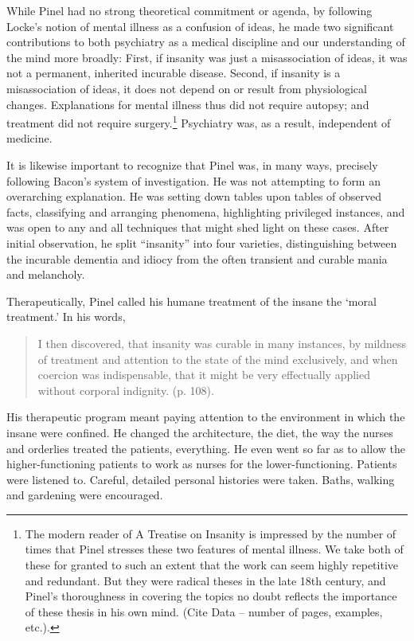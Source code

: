 \begin{refsection}
While Pinel had no strong theoretical commitment or agenda, by following Locke's notion of mental illness as a confusion of ideas, he made two significant contributions to both psychiatry as a medical discipline and our understanding of the mind more broadly: First, if insanity was just a misassociation of ideas, it was not a permanent, inherited incurable disease. Second, if insanity is a misassociation of ideas, it does not depend on or result from physiological changes. Explanations for mental illness thus did not require autopsy; and treatment did not require surgery.\footnote{The modern reader of A Treatise on Insanity is impressed by the number of times that Pinel stresses these two features of mental illness. We take both of these for granted to such an extent that the work can seem highly repetitive and redundant. But they were radical theses in the late 18th century, and Pinel's thoroughness in covering the topics no doubt reflects the importance of these thesis in his own mind. (Cite Data – number of pages, examples, etc.).} Psychiatry was, as a result, independent of medicine.

It is likewise important to recognize that Pinel was, in many ways, precisely following Bacon's system of investigation. He was not attempting to form an overarching explanation. He was setting down tables upon tables of observed facts, classifying and arranging phenomena, highlighting privileged instances, and was open to any and all techniques that might shed light on these cases. After initial observation, he split ``insanity'' into four varieties, distinguishing between the incurable dementia and idiocy from the often transient and curable mania and melancholy.

Therapeutically, Pinel called his humane treatment of the insane the `moral treatment.' In his words,

\begin{quote}

I then discovered, that insanity was curable in many instances, by mildness of treatment and attention to the state of the mind exclusively, and when coercion was indispensable, that it might be very effectually applied without corporal indignity. (p. 108).
\end{quote}

His therapeutic program meant paying attention to the environment in which the insane were confined. He changed the architecture, the diet, the way the nurses and orderlies treated the patients, everything. He even went so far as to allow the higher-functioning patients to work as nurses for the lower-functioning. Patients were listened to. Careful, detailed personal histories were taken. Baths, walking and gardening were encouraged.


\end{refsection}
